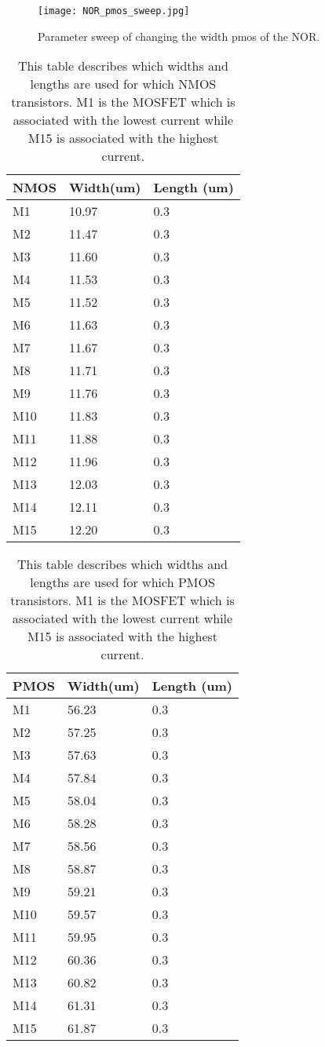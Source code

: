 \begin{figure}[h]
 \texttt{[image: NOR\_pmos\_sweep.jpg]}
 \caption{Parameter sweep of changing the width pmos of the NOR.}
 \label{fig:NOR_pmos_sweep_figure}
\end{figure}

\begin{table}[h!]
\caption{This table describes which widths and lengths are used for which NMOS transistors. M1 is the MOSFET which is associated with the lowest current while M15 is associated with the highest current.}
\begin{tabular}{l||l|l}\arraybackslash

NMOS & Width(um) & Length (um) \\\hline\hline
M1 & 10.97 & 0.3\\\hline
M2 & 11.47 & 0.3\\\hline
M3 & 11.60 & 0.3\\\hline
M4 &  11.53 & 0.3\\\hline
M5 & 11.52 & 0.3\\\hline
M6 & 11.63 & 0.3\\\hline
M7 & 11.67 & 0.3\\\hline
M8 & 11.71 & 0.3\\\hline
M9 & 11.76 & 0.3\\\hline
M10 & 11.83 & 0.3\\\hline
M11 & 11.88 & 0.3\\\hline
M12 & 11.96 & 0.3\\\hline
M13 & 12.03 & 0.3\\\hline
M14 & 12.11 & 0.3\\\hline
M15 & 12.20 & 0.3
\end{tabular}
\label{Tab:NMOS}
\end{table}
\begin{table}[h!]
\caption{This table describes which widths and lengths are used for which PMOS transistors. M1 is the MOSFET which is associated with the lowest current while M15 is associated with the highest current.} 
\begin{tabular}{l||l|l}
PMOS & Width(um) & Length (um) \\\hline\hline
M1 & 56.23 & 0.3\\\hline
M2 & 57.25 & 0.3\\\hline
M3 & 57.63 & 0.3\\\hline
M4 & 57.84& 0.3\\\hline
M5 & 58.04 & 0.3\\\hline
M6 & 58.28 & 0.3\\\hline
M7 & 58.56 & 0.3\\\hline
M8 & 58.87 & 0.3\\\hline
M9 & 59.21 & 0.3\\\hline
M10 & 59.57 & 0.3\\\hline
M11 & 59.95 & 0.3\\\hline
M12 & 60.36 & 0.3\\\hline
M13 & 60.82 & 0.3\\\hline
M14 & 61.31 & 0.3\\\hline
M15 & 61.87 & 0.3
\end{tabular}
\label{Tab:PMOS}
\end{table}

